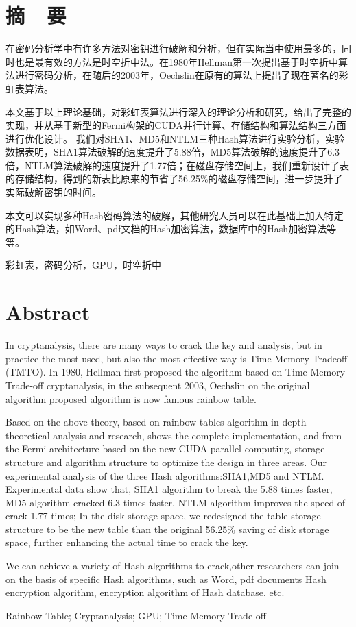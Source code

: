 \chapter* {摘~~要}
在密码分析学中有许多方法对密钥进行破解和分析，但在实际当中使用最多的，同时也是最有效的方法是时空折中法。在1980年Hellman第一次提出基于时空折中算法进行密码分析，在随后的2003年，Oechslin在原有的算法上提出了现在著名的彩虹表算法。

本文基于以上理论基础，对彩虹表算法进行深入的理论分析和研究，给出了完整的实现，并从基于新型的Fermi构架的CUDA并行计算、存储结构和算法结构三方面进行优化设计。
我们对SHA1、MD5和NTLM三种Hash算法进行实验分析，实验数据表明，SHA1算法破解的速度提升了5.88倍，MD5算法破解的速度提升了6.3倍，NTLM算法破解的速度提升了1.77倍；在磁盘存储空间上，我们重新设计了表的存储结构，得到的新表比原来的节省了56.25\%的磁盘存储空间，进一步提升了实际破解密钥的时间。

本文可以实现多种Hash密码算法的破解，其他研究人员可以在此基础上加入特定的Hash算法，如Word、pdf文档的Hash加密算法，数据库中的Hash加密算法等等。

\vskip 5cm
彩虹表，密码分析，GPU，时空折中\\
\chapter* {Abstract}
In cryptanalysis, there are many ways to crack the key and analysis, but in practice the most used, but also the most effective way is Time-Memory Tradeoff (TMTO).
In 1980, Hellman first proposed the algorithm based on Time-Memory Trade-off cryptanalysis, in the subsequent 2003, Oechslin on the original algorithm proposed algorithm is now famous rainbow table.

Based on the above theory, based on rainbow tables algorithm in-depth theoretical analysis and research, shows the complete implementation, and from the Fermi architecture based on the new CUDA parallel computing, storage structure and algorithm structure to optimize the design in three areas.
Our experimental analysis of the three Hash algorithms:SHA1,MD5 and NTLM.
Experimental data show that, SHA1 algorithm to break the 5.88 times faster, MD5 algorithm cracked 6.3 times faster, NTLM algorithm improves the speed of crack 1.77 times;
In the disk storage space, we redesigned the table storage structure to be the new table than the original 56.25\% saving of disk storage space, further enhancing the actual time to crack the key.

We can achieve a variety of Hash algorithms to crack,other researchers can join on the basis of specific Hash algorithms, such as Word, pdf documents Hash encryption algorithm, encryption algorithm of Hash database, etc.

\vskip 5cm
Rainbow Table; Cryptanalysis; GPU; Time-Memory Trade-off\\
